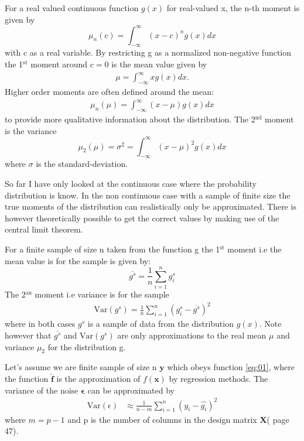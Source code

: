 \documentclass[uio,jmp,amsmath,amssymb,reprint,nofootinbib]{revtex4-1}
\numberwithin{equation}{section}
\newcommand{\infint}{\int_{-\infty}^\infty}
\begin{document}
For a real valued continuous function \(g(x)\) for real-valued x, the n-th moment is given by
\begin{equation}
    \mu_n(c) = \infint (x-c)^ng(x)dx
\end{equation}
with c as a real variable. By restricting g as a normalized non-negative function the 1\(^\text{st}\) moment around \(c=0\) is the mean value given by
\begin{align}
    \mu = \infint xg(x)dx.
\end{align}
Higher order moments are often defined around the mean:
\begin{align}
    \mu_n(\mu) = \infint (x-\mu)g(x)dx
\end{align}
to provide more qualitative information about the distribution. The 2\(^\text{nd}\) moment is the variance
\begin{equation}
    \mu_2(\mu) = \sigma^2 = \infint (x-\mu)^2g(x)dx
\end{equation}
where \(\sigma\) is the standard-deviation.

So far I have only looked at the continuous case where the probability distribution is know. In the non continuous case with a sample of finite size the true moments of the distribution can realistically only be approximated. There is however theoretically possible to get the correct values by making use of the central limit theorem.

For a finite sample of size n taken from the function g the 1\(^\text{st}\) moment i.e the mean value is for the sample is given by:
\begin{equation}\label{eq:02}
    \overline{g^s} = \frac{1}{n}\sum_{i=1}^n g_i^s
\end{equation}
The 2\(^\text{an}\) moment i.e variance is for the sample
\begin{align}\label{eq:03}
    \text{Var}(g^s) = \frac{1}{n}\sum_{i=1}^n (g^s_i - \overline{g^s})^2
\end{align}
where in both cases \(g^s\) is a sample of data from the distribution \(g(x)\). Note however that \(\overline{g^s}\) and \(\text{Var}(g^s)\) are only approximations to the real mean \(\mu\) and variance \(\mu_2\) for the distribution g.

Let's assume we are finite sample of size n \(\bm{y}\) which obeys function \ref{eq:01}, where the function \(\bm{\hat{f}}\) is the approximation of \(f(\bm{x})\) by regression methods. The variance of the noise \(\bm{\epsilon}\) can be approximated by
\begin{align}
    \text{Var}(\epsilon) &\approx \frac{1}{n - m}\sum_{i=1}^n (y_i - \hat{g_i})^2
\end{align}
where \(m = p-1\) and p is the number of columns in the design matrix \(\bm{X}\)(\cite{HastieTrevor2009TEoS} page 47).
\end{document}
